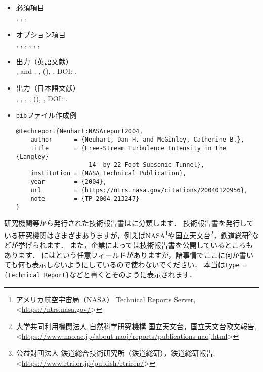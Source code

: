 \documentclass[a4paper,fleqn,uplatex,dvipdfmx]{jsarticle}
\begin{document}
\subsection{\tttechreport}
\label{ssec:techreport}
\begin{tcolorbox}[enhanced, title=\tttechreport, drop fuzzy shadow]
    \begin{itemize}
        \item 必須項目 \\
        \ttauthor, \tttitle, \ttinstitution, \ttyear
        \item オプション項目 \\
        \tttype, \ttnumber, \ttaddress, \ttmonth, \ttnote, \ttkey, \ttdoi
        \item 出力（英語文献） \\
            \colorbox[gray]{0.8}{\ttauthorf}, \colorbox[gray]{0.8}{\ttauthors} and \colorbox[gray]{0.8}{\ttauthort}, \colorbox[gray]{0.8}{\tttitle}, \colorbox[gray]{0.8}{\ttinstitution} (\colorbox[gray]{0.8}{\ttyear}), \colorbox[gray]{0.8}{\ttnote}, DOI: \colorbox[gray]{0.8}{\ttdoi}.
        \item 出力（日本語文献） \\
            \colorbox[gray]{0.8}{\ttauthorf}, \colorbox[gray]{0.8}{\ttauthors}, \colorbox[gray]{0.8}{\ttauthort}, \colorbox[gray]{0.8}{\tttitle}, \colorbox[gray]{0.8}{\ttinstitution} (\colorbox[gray]{0.8}{\ttyear}), \colorbox[gray]{0.8}{\ttnote}, DOI: \colorbox[gray]{0.8}{\ttdoi}.
        \item \verb|bib|ファイル作成例 \vspace{-3mm}
\begin{verbatim}
@techreport{Neuhart:NASAreport2004,
    author      = {Neuhart, Dan H. and McGinley, Catherine B.},
    title       = {Free-Stream Turbulence Intensity in the {Langley} 
                    14- by 22-Foot Subsonic Tunnel},
    institution = {NASA Technical Publication},
    year        = {2004},
    url         = {https://ntrs.nasa.gov/citations/20040120956},
    note        = {TP-2004-213247}
}
\end{verbatim}
    \end{itemize}
\end{tcolorbox}

研究機関等から発行された技術報告書は\tttechreport に分類します．
技術報告書を発行している研究機関はさまざまありますが，例えばNASA\footnote{アメリカ航空宇宙局（NASA） Technical Reports Server, \textless\url{https://ntrs.nasa.gov/}\textgreater}や国立天文台\footnote{大学共同利用機関法人 自然科学研究機構 国立天文台，国立天文台欧文報告, \textless\url{https://www.nao.ac.jp/about-naoj/reports/publications-naoj.html}\textgreater}，鉄道総研\footnote{公益財団法人 鉄道総合技術研究所（鉄道総研），鉄道総研報告, \textless\url{https://www.rtri.or.jp/publish/rtrirep/}\textgreater}などが挙げられます．
また，企業によっては技術報告書を公開しているところもあります．
\tttechreport には\tttype という任意フィールドがありますが，諸事情でここに何か書いても何も表示しないようにしているので使わないでください．
本当は\verb|type = {Technical Report}|などと書くとそのように表示されます．
\end{document}
